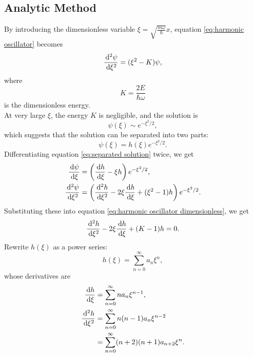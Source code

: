 \documentclass[en, oneside]{vivi}
\begin{document}
\subsection{Analytic Method}
    By introducing the dimensionless variable $\xi = \sqrt{\frac{m \omega}{\hbar}} x$, equation \eqref{eq:harmonic oscillator} becomes
    \begin{equation} \label{eq:harmonic oscillator dimensionless}
        \frac{\dif[2] \psi}{\dif \xi^2} = (\xi^2 - K) \psi,
    \end{equation}
    where
    \begin{equation} \label{eq:dimensionless energy}
        K = \frac{2E}{\hbar \omega}
    \end{equation}
    is the dimensionless energy.\\
    At very large $\xi$, the energy $K$ is negligible, and the solution is
    \begin{equation}
        \psi(\xi) \sim e^{-\xi^2/2},
    \end{equation}
    which suggests that the solution can be separated into two parts:
    \begin{equation} \label{eq:separated solution}
        \psi(\xi) = h(\xi) e^{-\xi^2/2}.
    \end{equation}
    Differentiating equation \eqref{eq:separated solution} twice, we get
    \begin{align}
        \frac{\dif \psi}{\dif \xi} &= \left( \frac{\dif h}{\dif \xi} - \xi h \right) e^{-\xi^2/2},\\
        \frac{\dif[2] \psi}{\dif \xi^2} &= \left( \frac{\dif[2] h}{\dif \xi^2} - 2\xi \frac{\dif h}{\dif \xi} + (\xi^2 - 1) h \right) e^{-\xi^2/2}.
    \end{align}
    Substituting these into equation \eqref{eq:harmonic oscillator dimensionless}, we get
    \begin{equation} \label{eq:harmonic oscillator dimensionless 2}
        \frac{\dif[2] h}{\dif \xi^2} - 2\xi \frac{\dif h}{\dif \xi} + (K - 1) h = 0.
    \end{equation}
    Rewrite $h(\xi)$ as a power series:
    \begin{equation}
        h(\xi) = \sum_{n=0}^\infty a_n \xi^n,
    \end{equation}
    whose derivatives are
    \begin{align}
        \frac{\dif h}{\dif \xi} &= \sum_{n=0}^\infty n a_n \xi^{n-1},\\
        \frac{\dif[2] h}{\dif \xi^2} &= \sum_{n=0}^\infty n(n-1) a_n \xi^{n-2}\\
        &= \sum_{n=0}^\infty (n+2)(n+1) a_{n+2} \xi^n.
    \end{align}
\end{document}
